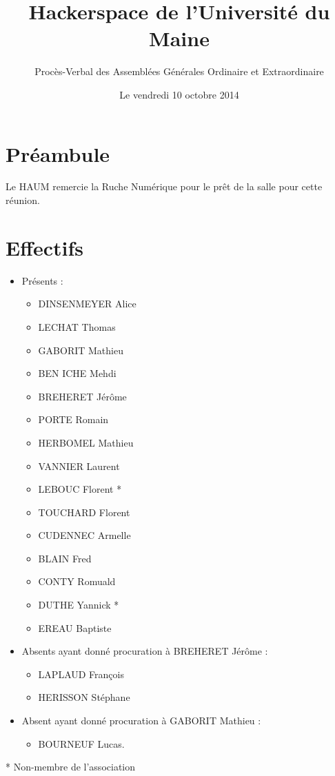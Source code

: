 \documentclass[a4paper, 11pt]{article}
\title{Hackerspace de l'Université du Maine}
\author{Procès-Verbal des Assemblées Générales Ordinaire et Extraordinaire}
\date{Le vendredi 10 octobre 2014}
\begin{document}
\maketitle

\section*{Préambule}

Le HAUM remercie la Ruche Numérique pour le prêt de la salle pour cette réunion.

\section{Effectifs}

\begin{itemize}
	\item Présents : 
		\begin{itemize}
		  \item DINSENMEYER Alice
		  \item LECHAT Thomas
		  \item GABORIT Mathieu
		  \item BEN ICHE Mehdi
		  \item BREHERET Jérôme
		  \item PORTE Romain
		  \item HERBOMEL Mathieu
		  \item VANNIER Laurent 
		  \item LEBOUC Florent *
		  \item TOUCHARD Florent
		  \item CUDENNEC Armelle
		  \item BLAIN Fred
		  \item CONTY Romuald
		  \item DUTHE Yannick *
		  \item EREAU Baptiste
		\end{itemize}
	\item Absents ayant donné procuration à BREHERET Jérôme :
		\begin{itemize}
			\item LAPLAUD François
			\item HERISSON Stéphane 
		\end{itemize}
	\item Absent ayant donné procuration à GABORIT Mathieu :
		\begin{itemize}
			\item BOURNEUF Lucas.
		\end{itemize}
\end{itemize}
* Non-membre de l'association
\end{document}
